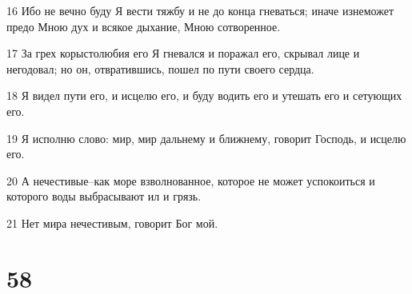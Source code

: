 \par 16 Ибо не вечно буду Я вести тяжбу и не до конца гневаться; иначе изнеможет предо Мною дух и всякое дыхание, Мною сотворенное.
\par 17 За грех корыстолюбия его Я гневался и поражал его, скрывал лице и негодовал; но он, отвратившись, пошел по пути своего сердца.
\par 18 Я видел пути его, и исцелю его, и буду водить его и утешать его и сетующих его.
\par 19 Я исполню слово: мир, мир дальнему и ближнему, говорит Господь, и исцелю его.
\par 20 А нечестивые--как море взволнованное, которое не может успокоиться и которого воды выбрасывают ил и грязь.
\par 21 Нет мира нечестивым, говорит Бог мой.

\chapter{58}

